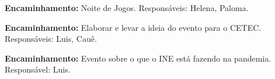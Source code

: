 \documentclass{ata-calico}
\begin{document}
\textbf{Encaminhamento:} Noite de Jogos. Responsáveis: Helena, Paloma.

\textbf{Encaminhamento:} Elaborar e levar a ideia do evento para o CETEC. Responsáveis: Luis, Cauê.

\textbf{Encaminhamento:} Evento sobre o que o INE está fazendo na pandemia. Responsável: Luis.

\end{document}
